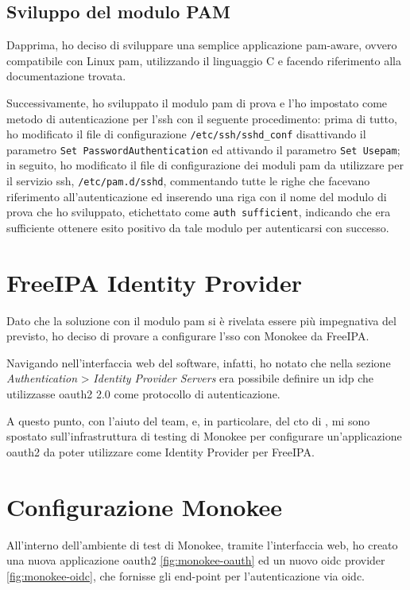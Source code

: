 \subsection{Sviluppo del modulo PAM}
Dapprima, ho deciso di sviluppare una semplice applicazione \acrshort{pam}-aware\cite{site:pam-app}, ovvero compatibile con Linux \acrshort{pam}, utilizzando il linguaggio C e facendo riferimento alla documentazione trovata\cite{site:writing-pam-application}\cite{site:understanding-pam}\cite{site:pam-configuration}\cite{site:linux-man-online}.  

Successivamente, ho sviluppato il modulo \acrshort{pam} di prova\cite{site:pam-module}\cite{site:pam-module-oidc} e l'ho impostato come metodo di autenticazione per l'\acrshort{ssh} con il seguente procedimento\cite{site:writing-pam-module}: prima di tutto, ho modificato il file di configurazione \texttt{/etc/ssh/sshd\_conf} disattivando il parametro \texttt{Set PasswordAuthentication} ed attivando il parametro \texttt{Set Use\acrshort{pam}}; in seguito, ho modificato il file di configurazione dei moduli \acrshort{pam} da utilizzare per il servizio \acrshort{ssh}, \texttt{/etc/pam.d/sshd}, commentando tutte le righe che facevano riferimento all'autenticazione ed inserendo una riga con il nome del modulo di prova che ho sviluppato, etichettato come \texttt{auth  sufficient}, indicando che era sufficiente ottenere esito positivo da tale modulo per autenticarsi con successo. 

\section{FreeIPA Identity Provider}

Dato che la soluzione con il modulo \acrshort{pam} si è rivelata essere più impegnativa del previsto, ho deciso di provare a configurare l'\acrshort{sso} con Monokee da FreeIPA. 

Navigando nell'interfaccia web del software, infatti, ho notato che nella sezione \textit{Authentication} > \textit{Identity Provider Servers} era possibile definire un \acrshort{idp} che utilizzasse \acrshort{oauth2} 2.0 come protocollo di autenticazione\cite{site:freeipa-docs}.

A questo punto, con l'aiuto del team, e, in particolare, del \acrfull{cto} di \myAzienda, mi sono spostato sull'infrastruttura di testing di Monokee per configurare un'applicazione \acrshort{oauth2} da poter utilizzare come Identity Provider per FreeIPA.

\section{Configurazione Monokee}
All'interno dell'ambiente di test di Monokee, tramite l'interfaccia web, ho creato una nuova applicazione \acrshort{oauth2}\cite{site:oauth-flow} \autoref{fig:monokee-oauth} ed un nuovo \acrshort{oidc} provider \autoref{fig:monokee-oidc}, che fornisse gli end-point per l'autenticazione via \acrshort{oidc}\cite{site:monokee-docs}.


